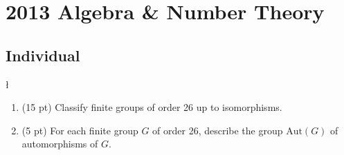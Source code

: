 \section{2013 Algebra \& Number Theory}

\subsection*{Individual}

\begin{exercise}
\l\label{2013:1}

\label{algebra:2013:1}\begin{enumerate}
    \item (15 pt) Classify finite groups of order 26 up to isomorphisms.
    \item (5 pt) For each finite group $G$ of order 26, describe the group $\mathrm{Aut}(G)$ of automorphisms of $G$.
\end{enumerate}
\end{exercise}

